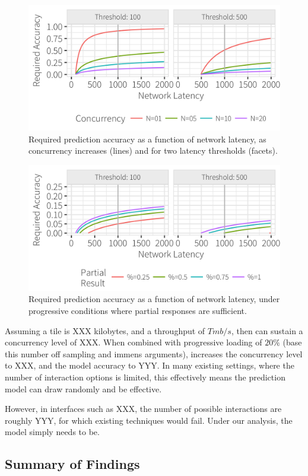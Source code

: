 \begin{figure}
	\centering
	\includegraphics[width=1\columnwidth]{figures/model_concurrency}
 	\caption{Required prediction accuracy as a function of network latency, as concurrency increases (lines) and for two latency thresholds (facets).}
  \label{fig:model_concurrency}
\end{figure}

\begin{figure}
	\centering
	\includegraphics[width=1\columnwidth]{figures/model_partial}
 	\caption{Required prediction accuracy as a function of network latency, under progressive conditions where partial responses are sufficient.}
    \label{fig:model_partial}
\end{figure}







Assuming a tile is XXX kilobytes, and a throughput of $T mb/s$, then can sustain a concurrency level of XXX.  
When combined with progressive loading of $20\%$ (base this number off sampling and immens arguments), increases the concurrency level to XXX, 
and the model accuracy to YYY.  In many existing settings, where the number of interaction options is limited, this effectively means the prediction model
can draw randomly and be effective.  

However, in interfaces such as XXX, the number of possible interactions are roughly YYY, for which existing techniques would fail.  Under our analysis, the model simply needs to be.



\subsection{Summary of Findings}

